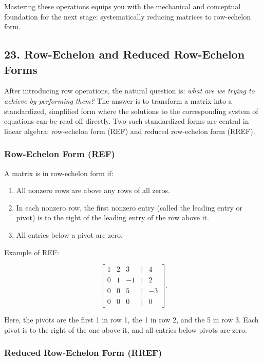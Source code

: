 \documentclass[
  letterpaper,
  DIV=11,
  numbers=noendperiod]{scrreprt}
\providecommand{\tightlist}{%
  \setlength{\itemsep}{0pt}\setlength{\parskip}{0pt}}
\begin{document}
Mastering these operations equips you with the mechanical and conceptual
foundation for the next stage: systematically reducing matrices to
row-echelon form.

\subsection{23. Row-Echelon and Reduced Row-Echelon
Forms}\label{row-echelon-and-reduced-row-echelon-forms}

After introducing row operations, the natural question is: \emph{what
are we trying to achieve by performing them?} The answer is to transform
a matrix into a standardized, simplified form where the solutions to the
corresponding system of equations can be read off directly. Two such
standardized forms are central in linear algebra: row-echelon form (REF)
and reduced row-echelon form (RREF).

\subsubsection{Row-Echelon Form (REF)}\label{row-echelon-form-ref}

A matrix is in row-echelon form if:

\begin{enumerate}
\def\labelenumi{\arabic{enumi}.}
\tightlist
\item
  All nonzero rows are above any rows of all zeros.
\item
  In each nonzero row, the first nonzero entry (called the leading entry
  or pivot) is to the right of the leading entry of the row above it.
\item
  All entries below a pivot are zero.
\end{enumerate}

Example of REF:

\[
\begin{bmatrix}  
1 & 2 & 3 & | & 4 \\  
0 & 1 & -1 & | & 2 \\  
0 & 0 & 5 & | & -3 \\  
0 & 0 & 0 & | & 0  
\end{bmatrix}.
\]

Here, the pivots are the first 1 in row 1, the 1 in row 2, and the 5 in
row 3. Each pivot is to the right of the one above it, and all entries
below pivots are zero.

\subsubsection{Reduced Row-Echelon Form
(RREF)}\label{reduced-row-echelon-form-rref}
\end{document}
